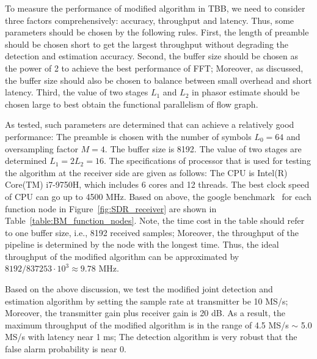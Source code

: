 To measure the performance of modified algorithm in TBB, we need to consider 
three factors comprehensively: accuracy, throughput and latency. Thus, some parameters should be
chosen by the following rules. First, the length of preamble should be chosen short to get the largest throughput
without degrading the detection and estimation accuracy. Second, the buffer size should be chosen as the power of 2
to achieve the best performance of FFT; Moreover, as discussed, the buffer size should also be chosen
to balance between small overhead and short latency. Third, the value of two stages $L_1$ and $L_2$
in phasor estimate should be chosen large to best obtain the functional parallelism
of flow graph.

As tested, such parameters are determined that can achieve a relatively good performance: 
The preamble is chosen with the number of symbols $L_0=64$ and oversampling factor $M=4$.
The buffer size is 8192. The value of two stages are determined $L_1=2L_2=16$.
The specifications of processor that is used for testing the algorithm at the receiver side are given as follows:
The CPU is Intel(R) Core(TM) i7-9750H, which includes 6 cores and 12 threads.
The best clock speed of CPU can go up to 4500 MHz. Based on above, 
the google benchmark~\cite{Google_benchmark} for each function node in Figure~\ref{fig:SDR_receiver} are shown in Table~\ref{table:BM_function_nodes}.
Note, the time cost in the table should refer to one buffer size, i.e., 8192 received samples; Moreover, the throughput of 
the pipeline is determined by the node with the longest time. Thus, the ideal throughput of the modified algorithm can be approximated by
$8192/837253 \cdot 10^3 \approx 9.78$ MHz.

Based on the above discussion, we test the modified joint detection and estimation algorithm by setting
the sample rate at transmitter be 10 MS/s; Moreover, the transmitter gain plus receiver gain
is 20 dB. As a result, the maximum throughput of the modified algorithm is in the range of 4.5 MS/s $\sim$ 5.0 MS/s with latency near 1 ms;
The detection algorithm is very robust that the false alarm probability is near 0.




